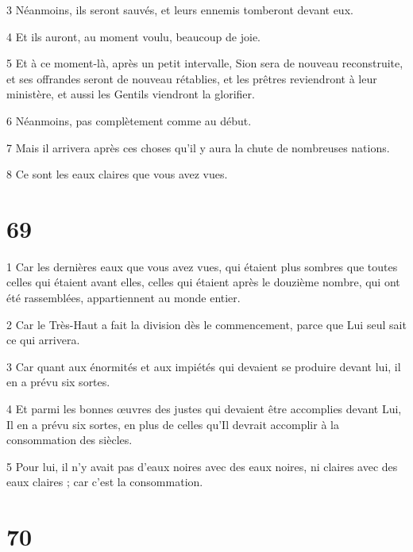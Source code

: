\par 3 Néanmoins, ils seront sauvés, et leurs ennemis tomberont devant eux.

\par 4 Et ils auront, au moment voulu, beaucoup de joie.

\par 5 Et à ce moment-là, après un petit intervalle, Sion sera de nouveau reconstruite, et ses offrandes seront de nouveau rétablies, et les prêtres reviendront à leur ministère, et aussi les Gentils viendront la glorifier.

\par 6 Néanmoins, pas complètement comme au début.

\par 7 Mais il arrivera après ces choses qu'il y aura la chute de nombreuses nations.

\par 8 Ce sont les eaux claires que vous avez vues.

\chapter{69}

\par 1 Car les dernières eaux que vous avez vues, qui étaient plus sombres que toutes celles qui étaient avant elles, celles qui étaient après le douzième nombre, qui ont été rassemblées, appartiennent au monde entier.

\par 2 Car le Très-Haut a fait la division dès le commencement, parce que Lui seul sait ce qui arrivera.

\par 3 Car quant aux énormités et aux impiétés qui devaient se produire devant lui, il en a prévu six sortes.

\par 4 Et parmi les bonnes œuvres des justes qui devaient être accomplies devant Lui, Il en a prévu six sortes, en plus de celles qu'Il devrait accomplir à la consommation des siècles.

\par 5 Pour lui, il n'y avait pas d'eaux noires avec des eaux noires, ni claires avec des eaux claires ; car c'est la consommation.

\chapter{70}

